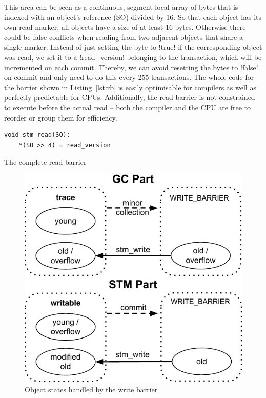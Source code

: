 \documentclass{sigplanconf}
\makeatletter
\renewcommand\lstinline[1][]{%
  \Collectverb{\@@myverb}%
}
\def\@@myverb#1{%
    \begingroup
    \fboxsep=0.2em
    \colorbox{verylightgray}{\oldlstinline|#1|}%
    \endgroup
}
\makeatother
\begin{document}
This area can be seen as a continuous, segment-local array of bytes
that is indexed with an object's reference (SO) divided by 16. So
that each object has its own read marker, all objects have a size of
at least 16 bytes. Otherwise there could be false conflicts when
reading from two adjacent objects that share a single marker.
Instead of just setting the byte to \lstinline!true!  if the
corresponding object was read, we set it to a \lstinline!read_version!
belonging to the transaction, which will be incremented on each
commit.  Thereby, we can avoid resetting the bytes to
\lstinline!false!  on commit and only need to do this every 255
transactions. The whole code for the barrier shown in
Listing~\ref{lst:rb} is easily optimisable for compilers as well as
perfectly predictable for CPUs. Additionally, the read barrier is not
constrained to execute before the actual read -- both the compiler and
the CPU are free to reorder or group them for efficiency.

\begin{code}[h]
\begin{lstlisting}
void stm_read(SO):
    *(SO >> 4) = read_version
\end{lstlisting}
\caption{The complete read barrier\label{lst:rb}}
\end{code}

\begin{figure}[h]
  \centering
  \includegraphics[width=0.8\columnwidth]{object_states.pdf}
  \caption{Object states handled by the write barrier\label{fig:obj_states}}
\end{figure}
\end{document}
